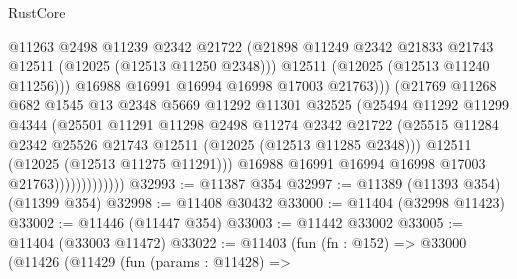 \begin{lexlean}{RustCore}
\begin{coremodule}
                                  @11263
                                  @2498
                                  @11239
                                  @2342
                                  @21722
                                  (@21898
                                    @11249
                                    @2342
                                    @21833
                                    @21743
                                    @12511
                                    (@12025 (@12513 @11250 @2348)))
                                  @12511
                                  (@12025 (@12513 @11240 @11256)))
                                @16988
                                @16991
                                @16994
                                @16998
                                @17003
                                @21763)))
                          (@21769
                            @11268
                            @682
                            @1545
                            @13
                            @2348
                            @5669
                            @11292
                            @11301
                            @32525
                            (@25494
                              @11292
                              @11299
                              @4344
                              (@25501
                                @11291
                                @11298
                                @2498
                                @11274
                                @2342
                                @21722
                                (@25515
                                  @11284
                                  @2342
                                  @25526
                                  @21743
                                  @12511
                                  (@12025 (@12513 @11285 @2348)))
                                @12511
                                (@12025 (@12513 @11275 @11291)))
                              @16988
                              @16991
                              @16994
                              @16998
                              @17003
                              @21763)))))))))))))
@32993 := @11387 @354
@32997 := @11389 (@11393 @354) (@11399 @354)
@32998 := @11408 @30432
@33000 := @11404 (@32998 @11423)
@33002 := @11446 (@11447 @354)
@33003 := @11442 @33002
@33005 := @11404 (@33003 @11472)
@33022 := @11403
    (fun (fn : @152) =>
    @33000
      (@11426
        (@11429
          (fun (params : @11428) =>

\end{coremodule}
\end{lexlean}
